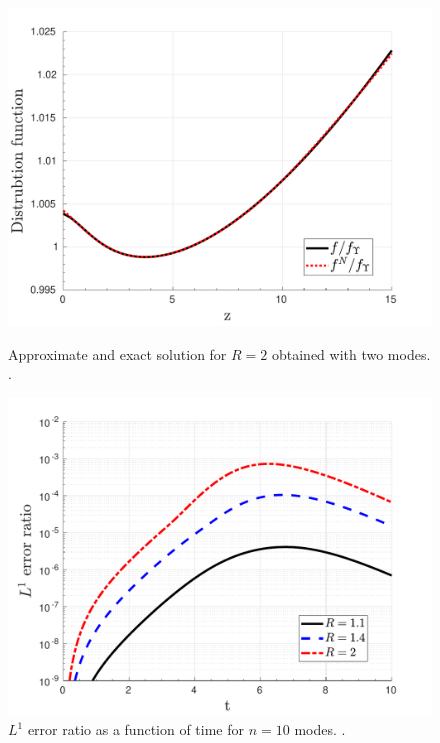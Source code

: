 \begin{figure}[ht]
\centerline{\includegraphics[width=0.9\linewidth]{06-appendix/SpectralMethodBoltzmann/Figures/keq_approx_T_r_2.pdf}}
\caption{Approximate and exact solution for $R=2$ obtained with two modes. .}\label{fig:keq_approx_Tr_2}
\centerline{\includegraphics[width=0.9\linewidth]{06-appendix/SpectralMethodBoltzmann/Figures/keq_L1_err_time.pdf}}
\caption{$L^1$ error ratio as a function of time for $n=10$ modes. .}\label{fig:keq_L1_err_time}
\end{figure}


\clearpage
